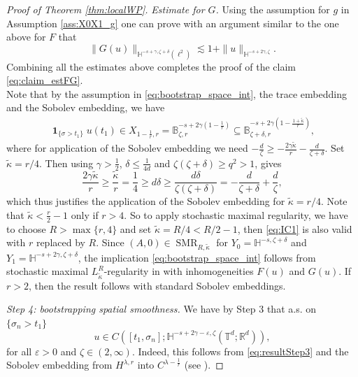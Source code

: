 \documentclass[11pt, a4paper,oneside, reqno]{amsart}
\theoremstyle{remark} %
\theoremstyle{definition} %
\numberwithin{theorem}{section}
\numberwithin{equation}{section}
\newcommand{\T}{\mathbb{T}}
\newcommand{\Hs}{\mathbb{H}}
\newcommand{\RR}{\mathbb{R}}
\newcommand{\BB}{\mathbb{B}}
\newcommand{\half}{\frac{1}{2}}
\newcommand{\RRd}{\RR^d}
\newcommand{\eps}{\varepsilon}
\newcommand{\gam}{\gamma}
\renewcommand{\tilde}[1]{\widetilde{#1}}
\DeclareMathOperator{\ind}{\mathbf{1}}
\DeclareMathOperator{\SMR}{SMR}
\begin{document}
\begin{proof}[Proof of Theorem \ref{thm:localWP}]
\textit{Estimate for $G$.} Using the assumption for $g$ in Assumption \ref{ass:X0X1_g} one can prove with an argument similar to the one above for $F$ that 
\begin{equation*}
    \|G(u)\|_{\Hs^{-s+\gam, \zeta+\delta}(\ell^2)}\lesssim 1+\|u\|_{\Hs^{-s+2\gam,\zeta}}.
\end{equation*}
Combining all the estimates above completes the proof of the claim \eqref{eq:claim_estFG}.\\


Note that by the assumption in \eqref{eq:bootstrap_space_int}, the trace embedding \cite[Proposition 2.1(2)]{AV25_survey} and the Sobolev embedding, we have 
\begin{align}\label{eq:IC1}
    \ind_{\{\sigma>t_1\}} u(t_1)\in X_{1-\frac{1}{r},r}=\BB^{-s+2\gam(1-\frac{1}{r})}_{\zeta,r}\subseteq \BB^{-s+2\gam(1-\frac{1+\tilde{\kappa}}{r})}_{\zeta+\delta,r},
\end{align}
where for application of the Sobolev embedding we need $-\frac{d}{\zeta}\geq - \frac{2\gam\tilde{\kappa}}{r}-\frac{d}{\zeta+\delta}$. Set $\tilde{\kappa}=r/4$. Then using $\gam>\half$, $\delta\leq \frac{1}{4d}$ and $\zeta(\zeta+\delta)\geq q^2>1$, gives
\begin{equation*}
    \frac{2\gam\tilde{\kappa}}{r}\geq \frac{\tilde{\kappa}}{r}=\frac{1}{4}\geq d\delta \geq \frac{d\delta}{\zeta(\zeta+\delta)} =-\frac{d}{\zeta+\delta}+ \frac{d}{\zeta},
\end{equation*}
which thus justifies the application of the Sobolev embedding for $\tilde{\kappa}=r/4$. Note that $\tilde{\kappa}<\frac r2 -1 $ only if $r>4$. So to apply stochastic maximal regularity, we have to choose $R>\max\{r,4\}$ and set $\tilde{\kappa}=R/4< R/2-1$, then \eqref{eq:IC1} is also valid with $r$ replaced by $R$. 
Since $(A,0)\in \SMR_{R,\tilde{\kappa}}$ for $Y_0=\Hs^{-s, \zeta+\delta}$ and $Y_1=\Hs^{-s+2\gam,\zeta+\delta}$, the implication \eqref{eq:bootstrap_space_int} follows from stochastic maximal $L^R_{\tilde{\kappa}}$-regularity in \cite[Proposition 3.11]{AV25_survey} with inhomogeneities $F(u)$ and $G(u)$. If $r>2$, then the result follows with standard Sobolev embeddings.

\textit{Step 4: bootstrapping spatial smoothness.} 
We have by Step 3 that a.s. on $\{\sigma_n>t_1\}$
\begin{equation}\label{eq:Step4_reg_u}
    u \in C([t_1,\sigma_n]; \Hs^{-s+2\gam-\eps,\zeta}(\T^d;\RRd)),
\end{equation}  
for all $\eps>0$ and $\zeta\in(2,\infty)$. Indeed, this follows from \eqref{eq:resultStep3} and the Sobolev embedding from $H^{\lambda, r}$ into $C^{\lambda-\frac{1}{r}}$ (see \cite[Theorem 14.7.9, Proposition 14.6.8 \& Corollary 14.4.27]{HNVW24}). 
 


\end{proof}
\end{document}
